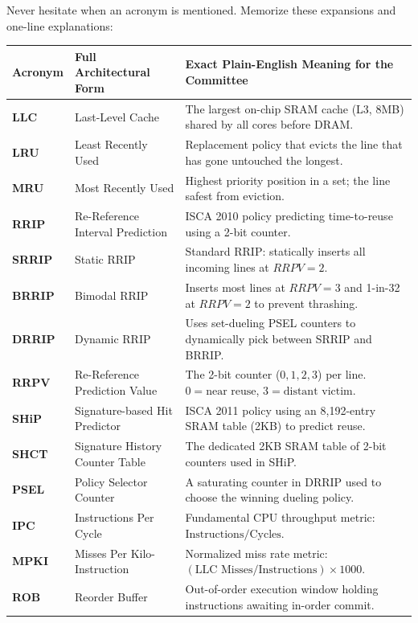 \documentclass[11pt, a4paper]{article}
\begin{document}
Never hesitate when an acronym is mentioned. Memorize these expansions and one-line explanations:

\begin{center}
\small
\begin{tabularx}{\textwidth}{@{}l >{\raggedright\arraybackslash}p{4.0cm} >{\raggedright\arraybackslash}X@{}}
\toprule
\textbf{Acronym} & \textbf{Full Architectural Form} & \textbf{Exact Plain-English Meaning for the Committee} \\
\midrule
\textbf{LLC} & Last-Level Cache & The largest on-chip SRAM cache (L3, 8MB) shared by all cores before DRAM. \\
\textbf{LRU} & Least Recently Used & Replacement policy that evicts the line that has gone untouched the longest. \\
\textbf{MRU} & Most Recently Used & Highest priority position in a set; the line safest from eviction. \\
\textbf{RRIP} & Re-Reference Interval Prediction & ISCA 2010 policy predicting time-to-reuse using a 2-bit counter. \\
\textbf{SRRIP} & Static RRIP & Standard RRIP: statically inserts all incoming lines at $RRPV=2$. \\
\textbf{BRRIP} & Bimodal RRIP & Inserts most lines at $RRPV=3$ and 1-in-32 at $RRPV=2$ to prevent thrashing. \\
\textbf{DRRIP} & Dynamic RRIP & Uses set-dueling PSEL counters to dynamically pick between SRRIP and BRRIP. \\
\textbf{RRPV} & Re-Reference Prediction Value & The 2-bit counter ($0, 1, 2, 3$) per line. $0=\text{near reuse}$, $3=\text{distant victim}$. \\
\textbf{SHiP} & Signature-based Hit Predictor & ISCA 2011 policy using an 8,192-entry SRAM table (2KB) to predict reuse. \\
\textbf{SHCT} & Signature History Counter Table & The dedicated 2KB SRAM table of 2-bit counters used in SHiP. \\
\textbf{PSEL} & Policy Selector Counter & A saturating counter in DRRIP used to choose the winning dueling policy. \\
\textbf{IPC} & Instructions Per Cycle & Fundamental CPU throughput metric: $\text{Instructions} / \text{Cycles}$. \\
\textbf{MPKI} & Misses Per Kilo-Instruction & Normalized miss rate metric: $(\text{LLC Misses} / \text{Instructions}) \times 1000$. \\
\textbf{ROB} & Reorder Buffer & Out-of-order execution window holding instructions awaiting in-order commit. \\

\end{tabularx}
\end{center}
\end{document}
